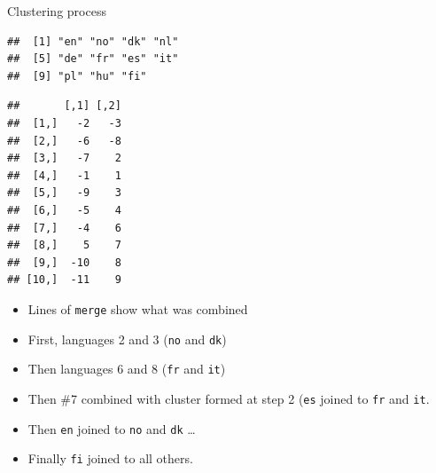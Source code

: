 \begin{frame}[fragile]{Clustering process}

  \begin{minipage}[t]{0.45\linewidth}


    
{\small    
\begin{knitrout}
\color{fgcolor}\begin{kframe}
\begin{alltt}
\hlopt{$}
\end{alltt}
\begin{verbatim}
##  [1] "en" "no" "dk" "nl"
##  [5] "de" "fr" "es" "it"
##  [9] "pl" "hu" "fi"
\end{verbatim}
\begin{alltt}
\hlopt{$}
\end{alltt}
\begin{verbatim}
##       [,1] [,2]
##  [1,]   -2   -3
##  [2,]   -6   -8
##  [3,]   -7    2
##  [4,]   -1    1
##  [5,]   -9    3
##  [6,]   -5    4
##  [7,]   -4    6
##  [8,]    5    7
##  [9,]  -10    8
## [10,]  -11    9
\end{verbatim}
\end{kframe}
\end{knitrout}
}
  \end{minipage}
  \begin{minipage}[t]{0.5\linewidth}
    \vspace{0.5in}
    \begin{itemize}
    \item Lines of \texttt{merge} show what was combined
    \item First, languages 2 and 3 (\texttt{no} and \texttt{dk})
    \item Then languages 6 and 8 (\texttt{fr} and \texttt{it})
    \item Then \#7 combined with cluster formed at step 2 (\texttt{es}
      joined to \texttt{fr} and \texttt{it}.
    \item Then \texttt{en} joined to \texttt{no} and \texttt{dk} \ldots
    \item Finally \texttt{fi} joined to all others.
    \end{itemize}
  \end{minipage}

\end{frame}

